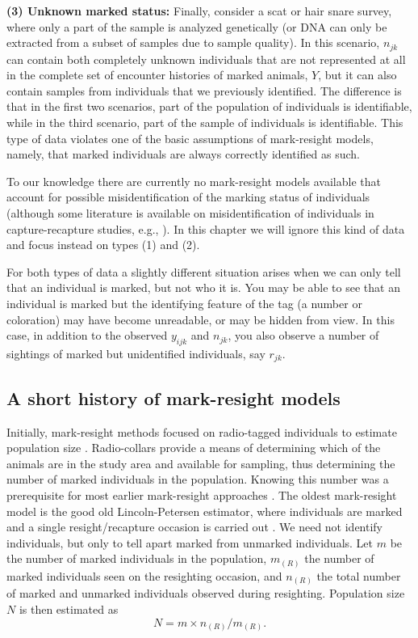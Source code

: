 {\flushleft \bf (3) Unknown marked status:} Finally, consider a scat
or hair snare survey, where only a part of the sample is analyzed
genetically (or DNA can only be extracted from a subset of samples due
to sample quality). In this scenario, $n_{jk}$ can contain both
completely unknown individuals that are not represented at all in the
complete set of encounter histories of marked animals, {\bf $Y$}, but
it can also contain samples from individuals that we previously
identified. The difference is that in the first two scenarios, part of
the population of individuals is identifiable, while in the third
scenario, part of the sample of individuals is identifiable. This type
of data violates one of the basic assumptions of mark-resight models,
namely, that marked individuals are always correctly identified as
such.

To our knowledge there are currently no mark-resight models available
that account for possible misidentification of the marking status of
individuals (although some literature is available on
misidentification of individuals in capture-recapture studies, e.g.,
\citealp{yoshizaki_etal:2009, lukacs_burnham:2005,
  link_etal:2010}). In this chapter we will ignore this kind of data
and focus instead on types (1) and (2).

For both types of data a slightly different situation arises when
we can only tell that an individual is marked, but not
who it is. You may be able to see that an individual is marked but the
identifying feature of the tag (a number or coloration) may have
become unreadable, or may be hidden from view. In this case, in
addition to the observed $y_{ijk}$ and $n_{jk}$, you also observe a number of
sightings of marked but unidentified individuals, say $r_{jk}$.

\subsection{A short history of mark-resight models}

Initially, mark-resight methods focused on radio-tagged individuals to
estimate population size \citep{white_shenk:2001}. Radio-collars
provide a means of determining which of the animals are in the study
area and available for sampling, thus determining the number of marked
individuals in the population. Knowing this number was a prerequisite
for most earlier mark-resight approaches \citep{white:1996}. The
oldest mark-resight model is the good old Lincoln-Petersen estimator,
where individuals are marked and a single resight/recapture occasion
is carried out \citep{krebs:1999}. We need not identify individuals,
but only to tell apart marked from unmarked individuals. Let $m$ be
the number of marked individuals in the population, $m_{(R)}$ the
number of marked individuals seen on the resighting occasion, and
$n_{(R)}$ the total number of marked and unmarked individuals observed
during resighting. Population size $N$ is then estimated as
\[
N = m \times n_{(R)}/m_{(R)}.
\]


